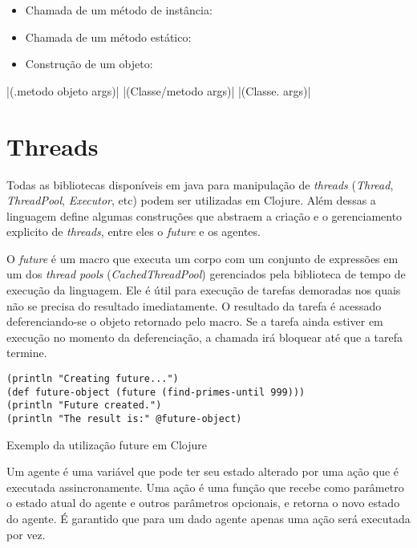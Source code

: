 \begin{listing}[!h]
 \begin{minipage}{0.48\textwidth}
  \centering
  \begin{itemize}
   \item Chamada de um método de instância:
   \item Chamada de um método estático:
   \item Construção de um objeto:
  \end{itemize}
 \end{minipage}
 \begin{minipage}{0.52\textwidth}
  |(.metodo objeto args)|
  |(Classe/metodo args)|
  |(Classe. args)|
 \end{minipage}
\end{listing}


\section{Threads}

Todas as bibliotecas disponíveis em java para manipulação de \emph{threads} (\emph{Thread}, \emph{ThreadPool}, \emph{Executor}, etc) podem ser utilizadas em Clojure. Além dessas a linguagem define algumas construções que abstraem a criação e o gerenciamento explicito de \emph{threads}, entre eles o \emph{future} e os agentes.

O \emph{future} é um macro que executa um corpo com um conjunto de expressões em um dos \emph{thread pools} (\emph{CachedThreadPool}) gerenciados pela biblioteca de tempo de execução da linguagem. Ele é útil para execução de tarefas demoradas nos quais não se precisa do resultado imediatamente. O resultado da tarefa é acessado deferenciando-se o objeto retornado pelo macro. Se a tarefa ainda estiver em execução no momento da deferenciação, a chamada irá bloquear até que a tarefa termine.

\begin{listing}
  \begin{verbatim}
(println "Creating future...")
(def future-object (future (find-primes-until 999)))
(println "Future created.")
(println "The result is:" @future-object)
  \end{verbatim}
  \caption{Exemplo da utilização future em Clojure}
\end{listing}

Um agente é uma variável que pode ter seu estado alterado por uma ação que é executada assincronamente. Uma ação é uma função que recebe como parâmetro o estado atual do agente e outros parâmetros opcionais, e retorna o novo estado do agente. É garantido que para um dado agente apenas uma ação será executada por vez.

